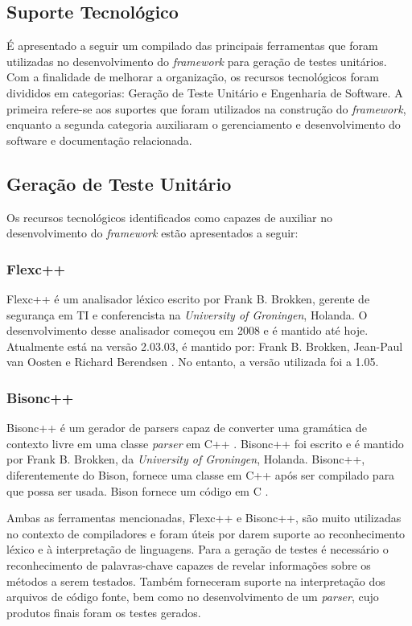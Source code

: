 \begin{apendicesenv}

\chapter[Suporte Tecnológico]{Suporte Tecnológico}
É apresentado a seguir um compilado das principais ferramentas que foram utilizadas no desenvolvimento do \textit{framework} para geração de testes unitários. Com a finalidade de melhorar a organização, os recursos tecnológicos foram divididos em categorias: Geração de Teste Unitário e Engenharia de Software. A primeira refere-se aos suportes que foram utilizados na construção do \textit{framework}, enquanto a segunda categoria auxiliaram o gerenciamento e desenvolvimento do software e documentação relacionada.

\section{Geração de Teste Unitário} \label{suporteGeracao}
Os recursos tecnológicos identificados como capazes de auxiliar no desenvolvimento do \textit{framework} estão apresentados a seguir:

\subsection{Flexc++}
Flexc++ é um analisador léxico escrito por Frank B. Brokken, gerente de segurança em TI e conferencista na \textit{University of Groningen}, Holanda\cite{flexcpp2015}. O desenvolvimento desse analisador começou em 2008 e é mantido até hoje. Atualmente está na versão 2.03.03, é mantido por: Frank B. Brokken, Jean-Paul van Oosten e Richard Berendsen \cite{flexcpp2015}. No entanto, a versão utilizada foi a 1.05. 
 
\subsection{Bisonc++}
Bisonc++ é um gerador de parsers capaz de converter uma gramática de contexto livre em uma classe \textit{parser} em C++ \cite{bisoncpp2015}. Bisonc++ foi escrito e é mantido por Frank B. Brokken, da \textit{University of Groningen}, Holanda. Bisonc++, diferentemente do Bison, fornece uma classe em C++ após ser compilado para que possa ser usada. Bison fornece um código em C \cite{bisoncpp2015}.
\par
\indent Ambas as ferramentas mencionadas, Flexc++ e Bisonc++, são muito utilizadas no contexto de compiladores \cite{aaby2004} e foram úteis por darem suporte ao reconhecimento léxico e à interpretação de linguagens. Para a geração de testes é necessário o reconhecimento de palavras-chave capazes de revelar informações sobre os métodos a serem testados. Também forneceram suporte na interpretação dos arquivos de código fonte, bem como no desenvolvimento de um \textit{parser}, cujo produtos finais foram os testes gerados.


\end{apendicesenv}
